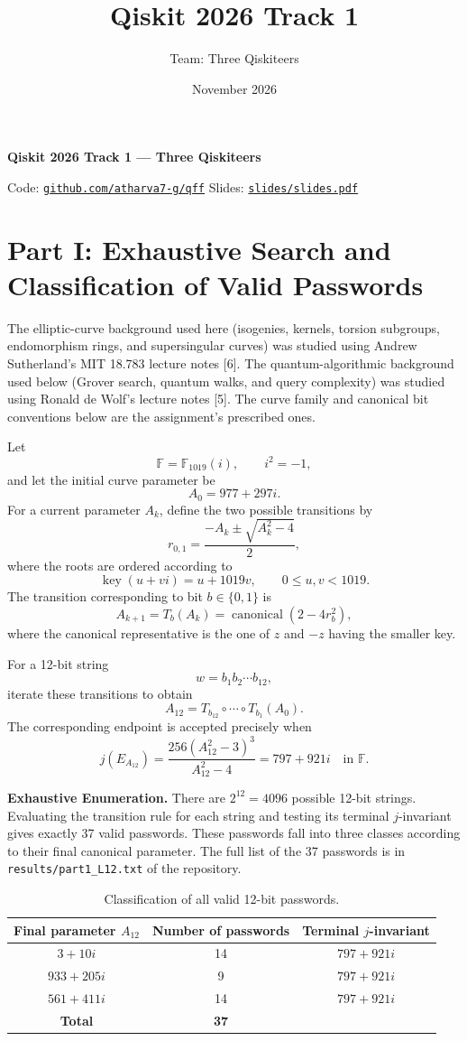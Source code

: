 \documentclass[10pt,a4paper]{article}
\title{Qiskit 2026 Track 1}
\author{Team: Three Qiskiteers}
\date{November 2026}
\begin{document}
{\centering\large\bfseries Qiskit 2026 Track 1 --- Three Qiskiteers\par}
{\centering\small Code: \href{https://github.com/atharva7-g/qff}{\texttt{github.com/atharva7-g/qff}}\quad
Slides: \href{https://github.com/atharva7-g/qff/blob/main/slides/slides.pdf}{\texttt{slides/slides.pdf}}\par}
\vspace{2pt}

\section*{Part I: Exhaustive Search and Classification of Valid Passwords}

The elliptic-curve background used here (isogenies, kernels, torsion
subgroups, endomorphism rings, and supersingular curves) was studied
using Andrew Sutherland's MIT 18.783 lecture notes [6]. The
quantum-algorithmic background used below (Grover search, quantum
walks, and query complexity) was studied using Ronald de Wolf's
lecture notes [5]. The curve family and canonical bit conventions
below are the assignment's prescribed ones.

Let
\[
\mathbb F=\mathbb F_{1019}(i),\qquad i^2=-1,
\]
and let the initial curve parameter be
\[
A_0=977+297i.
\]
For a current parameter \(A_k\), define the two possible transitions by
\[
r_{0,1}=\frac{-A_k\pm\sqrt{A_k^2-4}}{2},
\]
where the roots are ordered according to
\[
\operatorname{key}(u+vi)=u+1019v,
\qquad 0\leq u,v<1019.
\]
The transition corresponding to bit \(b\in\{0,1\}\) is
\[
\boxed{
A_{k+1}=T_b(A_k)
=\operatorname{canonical}(2-4r_b^2),
}
\]
where the canonical representative is the one of \(z\) and \(-z\)
having the smaller key.

For a 12-bit string
\[
w=b_1b_2\cdots b_{12},
\]
iterate these transitions to obtain
\[
A_{12}=T_{b_{12}}\circ\cdots\circ T_{b_1}(A_0).
\]
The corresponding endpoint is accepted precisely when
\[
j(E_{A_{12}})
=\frac{256(A_{12}^2-3)^3}{A_{12}^2-4}
=797+921i
\quad\text{in }\mathbb F.
\]

\textbf{Exhaustive Enumeration.}
There are \(2^{12}=4096\) possible 12-bit strings. Evaluating the
transition rule for each string and testing its terminal
\(j\)-invariant gives exactly 37 valid passwords. These passwords
fall into three classes according to their final canonical
parameter. The full list of the 37 passwords is in
\texttt{results/part1\_L12.txt} of the repository.

\begin{table}[ht]
\centering
\small
\begin{tabular}{c c c}
\hline
\textbf{Final parameter \(A_{12}\)}
& \textbf{Number of passwords}
& \textbf{Terminal \(j\)-invariant}\\
\hline
\(3+10i\)       & 14 & \(797+921i\)\\
\(933+205i\)    & 9  & \(797+921i\)\\
\(561+411i\)    & 14 & \(797+921i\)\\
\hline
\textbf{Total} & \textbf{37} & \\
\hline
\end{tabular}
\caption{Classification of all valid 12-bit passwords.}
\end{table}
\end{document}
